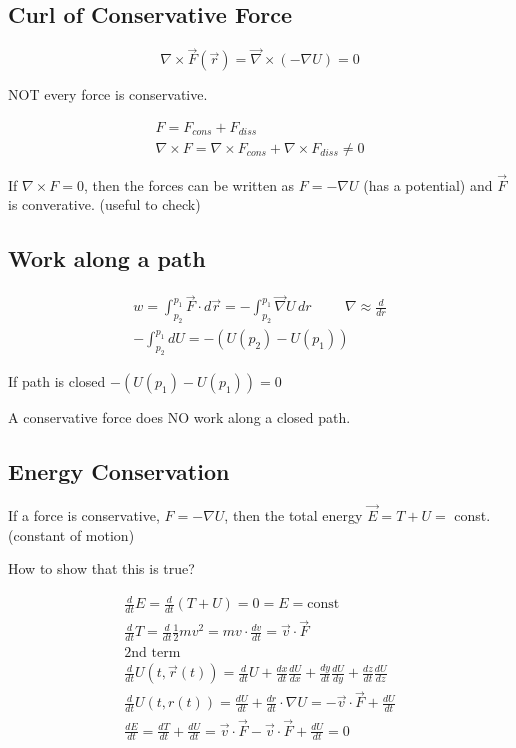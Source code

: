 \documentclass[fleqn]{report}
\newcommand{\hp}{\hspace{1cm}}
\newcommand{\equations} [1] {
\begin{gather*}
#1
\end{gather*}
}
\begin{document}
\subsection{Curl of Conservative Force}
\[
\nabla \times \vec F(\vec r) = 
\vec \nabla \times (- \nabla U) = 0
\]

NOT every force is conservative. 

\equations{
    F = F_{cons} + F_{diss} 
    \\
    \nabla \times F = \nabla \times F_{cons} +
    \nabla \times F_{diss} \neq 0
}

If $\nabla \times F = 0$, then the forces can be written 
as $F = - \nabla U$ (has a potential) and $\vec F$ is converative.
(useful to check)

\subsection{Work along a path}
\equations{
    w = \int_{p_2}^{p_1} \vec F \cdot d \vec r
    = - \int_{p_2}^{p_1} \vec \nabla U \, dr 
    \hp \nabla \approx \frac{d}{dr}
    \\
    - \int_{p_2}^{p_1} dU = -(U(p_2) - U(p_1))
}

If path is closed $-(U(p_1) - U(p_1)) = 0$


A conservative force does NO work along a closed path. 

\subsection{Energy Conservation} 
If a force is conservative, $F = - \nabla U$, then the total 
energy $\vec E = T + U =$ const. (constant of motion)

How to show that this is true?
\equations{
    \frac{d}{dt} E = \frac{d}{dt} (T + U) = 0 = E = \textrm{const}
    \\
    \frac{d}{dt} T = \frac{d}{dt} \frac{1}{2}mv^2 = mv \cdot \frac{dv}{dt} = \vec v \cdot \vec F
    \\
    \textrm{2nd term}
    \\
    \frac{d}{dt} U(t, \vec r(t)) =
    \frac{d}{dt} U + \frac{dx}{dt} \frac{dU}{dx} + 
    \frac{dy}{dt} \frac{dU}{dy} + \frac{dz}{dt} \frac{dU}{dz}
    \\
    \frac{d}{dt} U(t, r(t)) = \frac{dU}{dt} + \frac{dr}{dt} \cdot \nabla U
    = - \vec v \cdot \vec F + \frac{dU}{dt}
    \\
    \frac{dE}{dt} = 
    \frac{dT}{dt} + \frac{dU}{dt} = \vec v \cdot \vec F - 
    \vec v \cdot \vec F + \frac{dU}{dt} = 0
}
\end{document}
